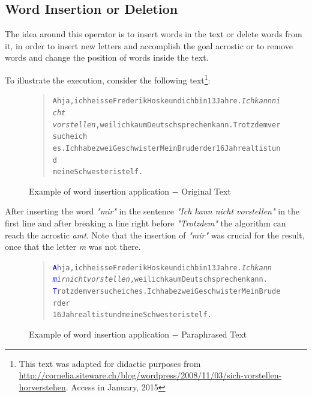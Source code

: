 \documentclass[11pt]{reportAlternative}
\begin{document}
\subsection{Word Insertion or Deletion}
The idea around this operator is to insert words in the text or delete words from it, in order to insert new letters and accomplish the goal acrostic or to remove words and change the position of words inside the text. \par

To illustrate the execution, consider the following text\footnote{This text was adapted for didactic purposes from \url{http://cornelia.siteware.ch/blog/wordpress/2008/11/03/sich-vorstellen-horverstehen}. Access in January, 2015}:

\begin{figure}[H]
\begin{quote}
\begin{alltt}
Ah ja, ich heisse Frederik Hoske und ich bin 13 Jahre. \textit{Ich kann nicht
vorstellen}, weil ich kaum Deutsch sprechen kann. Trotzdem versuche ich
es. Ich habe zwei Geschwister Mein Bruder der 16 Jahre alt ist und
meine Schwester ist elf.
\end{alltt}
\end{quote}
\caption{Example of word insertion application $-$ Original Text}
\end{figure}

After inserting the word \emph{"mir"} in the sentence \emph{"Ich kann nicht vorstellen"} in the first line and after breaking a line right before \emph{"Trotzdem"} the algorithm can reach the acrostic \emph{amt}. Note that the insertion of \emph{"mir"} was crucial for the result, once that the letter \emph{m} was not there.

\begin{figure}[H]
\begin{quote}
\begin{alltt}
\textcolor{Blue}{A}h ja, ich heisse Frederik Hoske und ich bin 13 Jahre. \textit{Ich kann
\textcolor{Blue}{m}ir nicht vorstellen}, weil ich kaum Deutsch sprechen kann.
\textcolor{Blue}{T}rotzdem versuche ich es. Ich habe zwei Geschwister Mein Bruder der
16 Jahre alt ist und meine Schwester ist elf.
\end{alltt}
\end{quote}
\caption{Example of word insertion application $-$ Paraphrased Text}
\end{figure}
\end{document}

